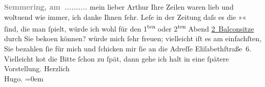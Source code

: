 \begin{ledgroupsized}[t]{13cm}
           \pstart
           \noindent{}\raggedleft{}\textcolor{gray}{\textbf{Semmering, am ..........}}\pend
           \pstart{}mein lieber Arthur \pend\pstart
           Ihre Zeilen waren lieb und woltuend wie immer, ich danke Ihnen ſehr.\pend
           \pstart
           Leſe in der Zeitung daſs es die »\label{K_L02053_1v}\label{K_L02053_1h}« ſind, die man ſpielt, würde ich wohl für
               den 1\textsuperscript{ten}{ }{\pb}oder 2\textsuperscript{ten} Abend \uline{2 Balconsitze} durch Sie beko{\geminationm}en können? würde mich ſehr freuen; vielleicht iſt es am
               einfachſten, Sie bezahlen ſie für mich und ſchicken mir ſie an die Adreſſe Eliſabethſtraße 6.\pend
           \pstart
           Vielleicht ko{\geminationm}t die Bitte ſchon zu ſpät, dann gehe ich
               halt in eine ſpätere Vorstellung.\pend
           \pstart
           Herzlich{\\[\baselineskip]}\spacefill\mbox{Hugo.}\pend
           \leftskip=0em{}\endnumbering{}\end{ledgroupsized}  \newcommand{\dateiname}{L02053}\newcommand{\titel}{Hugo von Hofmannsthal an Arthur Schnitzler, [7. 2. 1912]}\newcommand{\editorInnen}{Martin Anton Müller und Gerd-Hermann Susen}
            \footnotesize
\begin{ledgroupsized}[t]{11.5cm}
\end{ledgroupsized}
         
      
